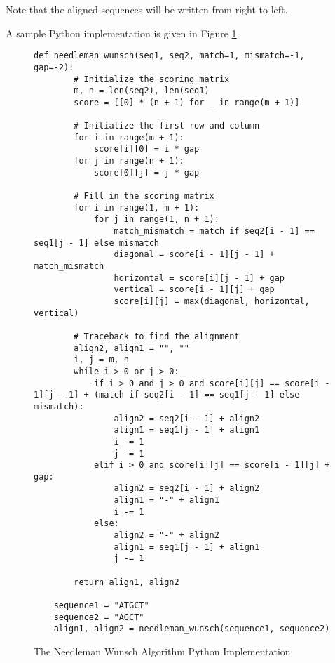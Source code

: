 Note that the aligned sequences will be written from right to left.

A sample Python implementation is given in Figure \ref{fig:needleman-wunsch}

\begin{figure}[H]
    \centering
    \begin{lstlisting}[basicstyle=\footnotesize]
    def needleman_wunsch(seq1, seq2, match=1, mismatch=-1, gap=-2):
        # Initialize the scoring matrix
        m, n = len(seq2), len(seq1)
        score = [[0] * (n + 1) for _ in range(m + 1)]
    
        # Initialize the first row and column
        for i in range(m + 1):
            score[i][0] = i * gap
        for j in range(n + 1):
            score[0][j] = j * gap
    
        # Fill in the scoring matrix
        for i in range(1, m + 1):
            for j in range(1, n + 1):
                match_mismatch = match if seq2[i - 1] == seq1[j - 1] else mismatch
                diagonal = score[i - 1][j - 1] + match_mismatch
                horizontal = score[i][j - 1] + gap
                vertical = score[i - 1][j] + gap
                score[i][j] = max(diagonal, horizontal, vertical)
    
        # Traceback to find the alignment
        align2, align1 = "", ""
        i, j = m, n
        while i > 0 or j > 0:
            if i > 0 and j > 0 and score[i][j] == score[i - 1][j - 1] + (match if seq2[i - 1] == seq1[j - 1] else mismatch):
                align2 = seq2[i - 1] + align2
                align1 = seq1[j - 1] + align1
                i -= 1
                j -= 1
            elif i > 0 and score[i][j] == score[i - 1][j] + gap:
                align2 = seq2[i - 1] + align2
                align1 = "-" + align1
                i -= 1
            else:
                align2 = "-" + align2
                align1 = seq1[j - 1] + align1
                j -= 1
    
        return align1, align2
    
    sequence1 = "ATGCT"
    sequence2 = "AGCT"
    align1, align2 = needleman_wunsch(sequence1, sequence2)
    \end{lstlisting}
    \caption{The Needleman Wunsch Algorithm Python Implementation}
    \label{fig:needleman-wunsch}
\end{figure}

